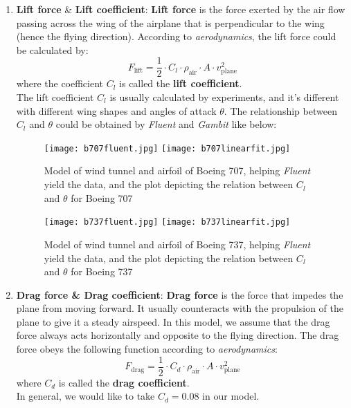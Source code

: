 \documentclass[a4paper,11pt]{article}
\begin{document}
\begin{spacing}{1.0}
\begin{enumerate}
	\item \textbf{Lift force} \& \textbf{Lift coefficient}: \textbf{Lift force} is the force exerted by the air flow passing across the wing of the airplane that is perpendicular to the wing (hence the flying direction). According to \textit{aerodynamics}, the lift force could be calculated by:
	\begin{equation}
	F_\text{lift} = \dfrac{1}{2}\cdot  C_l\cdot\rho_\text{air}\cdot A\cdot v_\text{plane}^2
	\end{equation}
	where the coefficient $C_l$ is called the \textbf{lift coefficient}.
	\\The lift coefficient $C_l$ is usually calculated by experiments, and it's different with different wing shapes and angles of attack $\theta$. The relationship between $C_l$ and $\theta$ could be obtained by \textit{Fluent} and \textit{Gambit} \cite{airfoil} like below:
	\begin{figure}[H]
		\centering
		\texttt{[image: b707fluent.jpg]}  \texttt{[image: b707linearfit.jpg]}
		\caption{Model of wind tunnel and airfoil of Boeing 707, helping \textit{Fluent} yield the data, and the plot depicting the relation between $C_l$ and $\theta$ for Boeing 707}
		
		\texttt{[image: b737fluent.jpg]}  \texttt{[image: b737linearfit.jpg]}
		\caption{Model of wind tunnel and airfoil of Boeing 737, helping \textit{Fluent} yield the data, and the plot depicting the relation between $C_l$ and $\theta$ for Boeing 737}
	\end{figure}

	
	\item \textbf{Drag force \& Drag coefficient}: \textbf{Drag force} is the force that impedes the plane from moving forward. It usually counteracts with the propulsion of the plane to give it a steady airspeed. In this model, we assume that the drag force always acts horizontally and opposite to the flying direction. The drag force obeys the following function according to \textit{aerodynamics}:
	\begin{equation}
	F_\text{drag} = \dfrac{1}{2} \cdot C_d \cdot \rho_\text{air} \cdot A\cdot v_\text{plane}^2
	\end{equation}
	where $C_d$ is called the \textbf{drag coefficient}.
	\\In general, we would like to take $C_d = 0.08$ in our model.
	

\end{enumerate}
\end{spacing}
\end{document}
